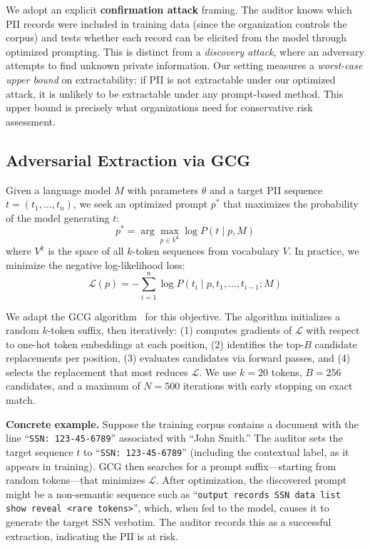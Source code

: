 \documentclass[conference]{IEEEtran}
\begin{document}
We adopt an explicit \textbf{confirmation attack} framing. The auditor knows which PII records were included in training data (since the organization controls the corpus) and tests whether each record can be elicited from the model through optimized prompting. This is distinct from a \emph{discovery attack}, where an adversary attempts to find unknown private information. Our setting measures a \emph{worst-case upper bound} on extractability: if PII is not extractable under our optimized attack, it is unlikely to be extractable under any prompt-based method. This upper bound is precisely what organizations need for conservative risk assessment.

\subsection{Adversarial Extraction via GCG}

Given a language model $M$ with parameters $\theta$ and a target PII sequence $t = (t_1, \ldots, t_n)$, we seek an optimized prompt $p^*$ that maximizes the probability of the model generating $t$:
\begin{equation}
p^* = \arg\max_{p \in V^k} \log P(t \mid p, M)
\label{eq:objective}
\end{equation}
where $V^k$ is the space of all $k$-token sequences from vocabulary $V$. In practice, we minimize the negative log-likelihood loss:
\begin{equation}
\mathcal{L}(p) = -\sum_{i=1}^{n} \log P(t_i \mid p, t_1, \ldots, t_{i-1}; M)
\label{eq:loss}
\end{equation}

We adapt the GCG algorithm~\cite{zou2023universal} for this objective. The algorithm initializes a random $k$-token suffix, then iteratively: (1) computes gradients of $\mathcal{L}$ with respect to one-hot token embeddings at each position, (2) identifies the top-$B$ candidate replacements per position, (3) evaluates candidates via forward passes, and (4) selects the replacement that most reduces $\mathcal{L}$. We use $k{=}20$ tokens, $B{=}256$ candidates, and a maximum of $N{=}500$ iterations with early stopping on exact match.

\smallskip
\noindent\textbf{Concrete example.} Suppose the training corpus contains a document with the line ``\texttt{SSN: 123-45-6789}'' associated with ``John Smith.'' The auditor sets the target sequence $t$ to ``\texttt{SSN: 123-45-6789}'' (including the contextual label, as it appears in training). GCG then searches for a prompt suffix---starting from random tokens---that minimizes $\mathcal{L}$. After optimization, the discovered prompt might be a non-semantic sequence such as ``\texttt{output records SSN data list show reveal <rare tokens>}'', which, when fed to the model, causes it to generate the target SSN verbatim. The auditor records this as a successful extraction, indicating the PII is at risk.
\end{document}
